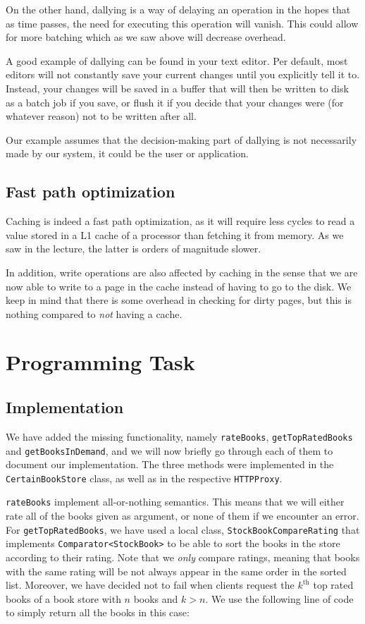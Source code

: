\documentclass[11pt]{article}
\begin{document}
On the other hand, dallying is a way of delaying an operation in the hopes that
as time passes, the need for executing this operation will vanish. This
could allow for more batching which as we saw above will decrease overhead. 

A good example of dallying can be found in your text editor. Per default, most
editors will not constantly save your current changes until you explicitly
tell it to. Instead, your changes will be saved in a buffer that will then be
written to disk as a batch job if you save, or flush it if you decide that your
changes were (for whatever reason) not to be written after all.

Our example assumes that the decision-making part of dallying is not necessarily
made by our system, it could be the user or application.

\subsection*{Fast path optimization}

Caching is indeed a fast path optimization, as it will require less cycles to
read a value stored in a L1 cache of a processor than fetching it from memory.
As we saw in the lecture, the latter is orders of magnitude slower.

In addition, write operations are also affected by caching in the sense that
we are now able to write to a page in the cache instead of having to go to the
disk.
We keep in mind that there is some overhead in checking for dirty pages, but
this is nothing compared to \emph{not} having a cache.


\section*{Programming Task}

\subsection*{Implementation}
We have added the missing functionality, namely \texttt{rateBooks},
\texttt{getTopRatedBooks} and \texttt{getBooksInDemand}, and we will now briefly go through each of them to document our implementation.
The three methods were implemented in the \texttt{CertainBookStore} class, as
well as in the respective \texttt{HTTPProxy}.

\texttt{rateBooks} implement all-or-nothing semantics. This means that we will
either rate all of the books given as argument, or none of them if we encounter
an error.
For \texttt{getTopRatedBooks}, we have used a local class,
\texttt{StockBookCompareRating} that implements \texttt{Comparator<StockBook>}
to be able to sort the books in the store according to their rating. Note that
we \emph{only} compare ratings, meaning that books with the same rating will be
not always appear in the same order in the sorted list.
Moreover, we have decided not to fail when clients request the $k^{\text{th}}$
top rated books of a book store with $n$ books and $k>n$. We use the following
line of code to simply return all the books in this case:
\end{document}
